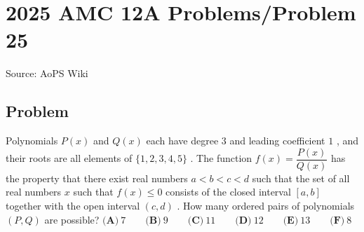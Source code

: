 \documentclass[12pt]{article}
\begin{document}
\section*{{2025 AMC 12A Problems/Problem 25}}
Source: AoPS Wiki

\subsection*{Problem}
Polynomials $P(x)$ and $Q(x)$ each have degree $3$ and leading coefficient $1$ , and their roots are all elements of $\{1,2,3,4,5\}$ . The function $f(x) = \dfrac{P(x)}{Q(x)}$ has the property that there exist real numbers $a < b < c < d$ such that the set of all real numbers $x$ such that $f(x) \leq 0$ consists of the closed interval $[a,b]$ together with the open interval $(c,d)$ . How many ordered pairs of polynomials $(P, Q)$ are possible? $\textbf{(A)}~7 \qquad \textbf{(B)}~9 \qquad \textbf{(C)}~11 \qquad \textbf{(D)}~12 \qquad \textbf{(E)}~13 \qquad \textbf{(F)}~8$
\end{document}
